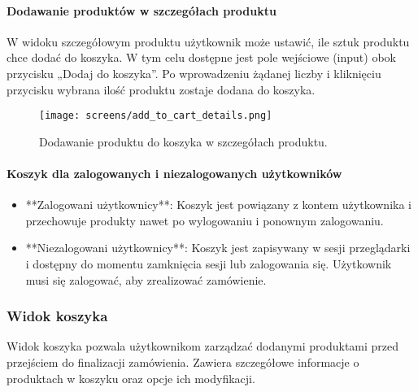 \documentclass[12pt,a4paper,oneside]{article}
\theoremstyle{definition}
\numberwithin{equation}{section}
\begin{document}
   \paragraph{Dodawanie produktów w szczegółach produktu}
   W widoku szczegółowym produktu użytkownik może ustawić, ile sztuk produktu chce dodać do koszyka. W tym celu dostępne jest pole wejściowe (input) obok przycisku „Dodaj do koszyka”. Po wprowadzeniu żądanej liczby i kliknięciu przycisku wybrana ilość produktu zostaje dodana do koszyka.
   \begin{figure}[h!]
    \centering
    \texttt{[image: screens/add\_to\_cart\_details.png]}
    \caption{Dodawanie produktu do koszyka w szczegółach produktu.}
    \label{fig:add_to_cart_details}
\end{figure}

   
   \paragraph{Koszyk dla zalogowanych i niezalogowanych użytkowników}
   \begin{itemize}
       \item **Zalogowani użytkownicy**: Koszyk jest powiązany z kontem użytkownika i przechowuje produkty nawet po wylogowaniu i ponownym zalogowaniu.
       \item **Niezalogowani użytkownicy**: Koszyk jest zapisywany w sesji przeglądarki i dostępny do momentu zamknięcia sesji lub zalogowania się. Użytkownik musi się zalogować, aby zrealizować zamówienie.
   \end{itemize}
   




   \subsubsection{Widok koszyka}
Widok koszyka pozwala użytkownikom zarządzać dodanymi produktami przed przejściem do finalizacji zamówienia. Zawiera szczegółowe informacje o produktach w koszyku oraz opcje ich modyfikacji.
\end{document}
